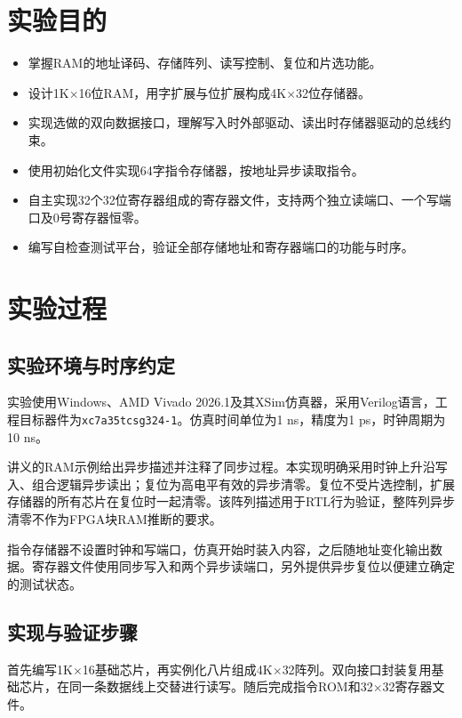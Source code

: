 \documentclass[12pt,a4paper]{ctexart}
\title{\reporttitle}
\author{姓名：\authname\quad 班级：\class\\学号：\authid}
\date{2026年11月16日}
\begin{document}
\maketitle
\tableofcontents
\newpage
\section{实验目的}
\begin{itemize}
\item 掌握RAM的地址译码、存储阵列、读写控制、复位和片选功能。
\item 设计1K$\times$16位RAM，用字扩展与位扩展构成4K$\times$32位存储器。
\item 实现选做的双向数据接口，理解写入时外部驱动、读出时存储器驱动的总线约束。
\item 使用初始化文件实现64字指令存储器，按地址异步读取指令。
\item 自主实现32个32位寄存器组成的寄存器文件，支持两个独立读端口、一个写端口及0号寄存器恒零。
\item 编写自检查测试平台，验证全部存储地址和寄存器端口的功能与时序。
\end{itemize}

\section{实验过程}
\subsection{实验环境与时序约定}
实验使用Windows、AMD Vivado 2026.1及其XSim仿真器，采用Verilog语言，工程目标器件为\texttt{xc7a35tcsg324-1}。仿真时间单位为1 ns，精度为1 ps，时钟周期为10 ns。

讲义的RAM示例给出异步描述并注释了同步过程。本实现明确采用时钟上升沿写入、组合逻辑异步读出；复位为高电平有效的异步清零。复位不受片选控制，扩展存储器的所有芯片在复位时一起清零。该阵列描述用于RTL行为验证，整阵列异步清零不作为FPGA块RAM推断的要求。

指令存储器不设置时钟和写端口，仿真开始时装入内容，之后随地址变化输出数据。寄存器文件使用同步写入和两个异步读端口，另外提供异步复位以便建立确定的测试状态。

\subsection{实现与验证步骤}
首先编写1K$\times$16基础芯片，再实例化八片组成4K$\times$32阵列。双向接口封装复用基础芯片，在同一条数据线上交替进行读写。随后完成指令ROM和32$\times$32寄存器文件。
\end{document}

